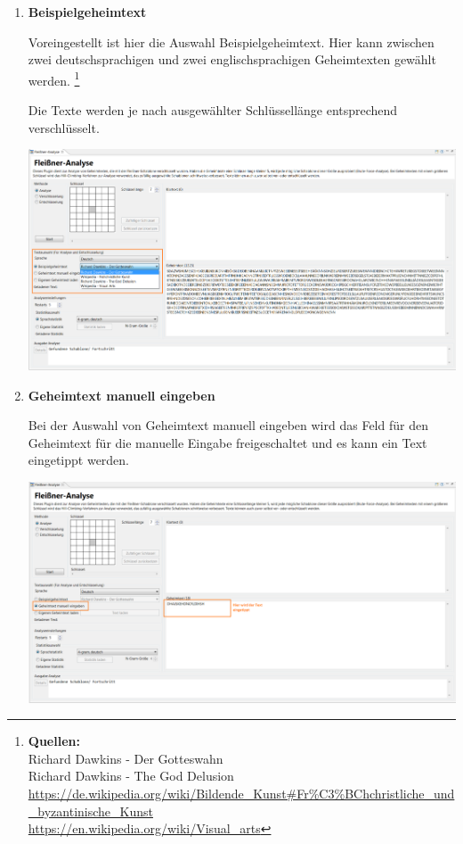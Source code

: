 \documentclass[fontsize=12pt, DIV=15, parskip=half-]{scrartcl}
\theoremstyle{break}
\begin{document}
\begin{enumerate}[label=(\alph*), leftmargin=*]
\item \textbf{Beispielgeheimtext}

Voreingestellt ist hier die Auswahl \glqq Beispielgeheimtext\grqq. 
Hier kann zwischen zwei deutschsprachigen und zwei englischsprachigen
Geheimtexten gewählt werden. \footnote{\textbf{Quellen:}\\ Richard Dawkins - Der Gotteswahn\\ Richard Dawkins - The God Delusion\\ \url{https://de.wikipedia.org/wiki/Bildende_Kunst\#Fr\%C3\%BChchristliche_und_byzantinische_Kunst}\\ \url{https://en.wikipedia.org/wiki/Visual_arts}} 

Die Texte werden je nach ausgewählter Schlüssellänge entsprechend verschlüsselt. 

\includegraphics[scale=0.4]{FleissnerTxtAuswahl.png}
\newpage

\item \textbf{Geheimtext manuell eingeben}

Bei der Auswahl von \glqq Geheimtext manuell eingeben\grqq{} wird das Feld für den Geheimtext für die manuelle Eingabe freigeschaltet und es kann ein Text eingetippt werden.

\includegraphics[scale=0.4]{FleissnerManGhtxt.png}


\end{enumerate}
\end{document}
